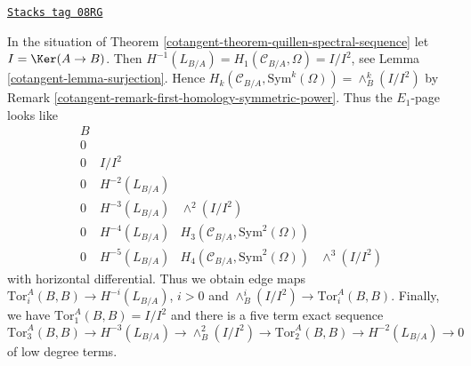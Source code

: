 \begin{remark}[Elucidate ss]
\label{cotangent-remark-elucidate-ss}
\href{https://stacks.math.columbia.edu/tag/08RG}{\texttt{Stacks tag 08RG}}

In the situation of Theorem \ref{cotangent-theorem-quillen-spectral-sequence}
let $I = \Ker(A \to B)$. Then
$H^{-1}(L_{B/A}) = H_1(\mathcal{C}_{B/A}, \Omega) = I/I^2$, see
Lemma \ref{cotangent-lemma-surjection}.
Hence $H_k(\mathcal{C}_{B/A}, \text{Sym}^k(\Omega)) = \wedge^k_B(I/I^2)$ by
Remark \ref{cotangent-remark-first-homology-symmetric-power}. Thus the
$E_1$-page looks like
$$
\begin{matrix}
B \\
0 \\
0 & I/I^2 \\
0 & H^{-2}(L_{B/A}) \\
0 & H^{-3}(L_{B/A}) & \wedge^2(I/I^2) \\
0 & H^{-4}(L_{B/A}) & H_3(\mathcal{C}_{B/A}, \text{Sym}^2(\Omega)) \\
0 & H^{-5}(L_{B/A}) & H_4(\mathcal{C}_{B/A}, \text{Sym}^2(\Omega)) &
\wedge^3(I/I^2)
\end{matrix}
$$
with horizontal differential. Thus we obtain edge maps
$\text{Tor}_i^A(B, B) \to H^{-i}(L_{B/A})$, $i > 0$ and
$\wedge^i_B(I/I^2) \to \text{Tor}_i^A(B, B)$. Finally, we have
$\text{Tor}_1^A(B, B) = I/I^2$ and there is a
five term exact sequence
$$
\text{Tor}_3^A(B, B) \to H^{-3}(L_{B/A}) \to \wedge^2_B(I/I^2) \to
\text{Tor}_2^A(B, B) \to H^{-2}(L_{B/A}) \to 0
$$
of low degree terms.
\end{remark}

